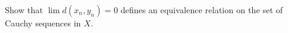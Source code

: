 Show that $\lim d(x_n,y_n)=0$ defines an equivalence relation on the set of Cauchy sequences in $X$.\\